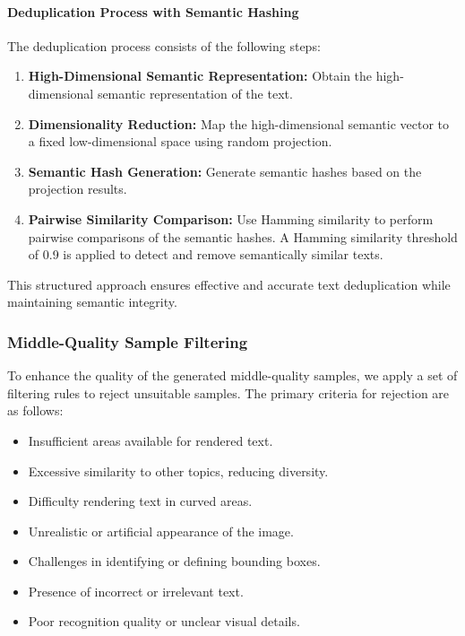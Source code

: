 \paragraph{Deduplication Process with Semantic Hashing}
The deduplication process consists of the following steps:
\begin{enumerate}
    \item \textbf{High-Dimensional Semantic Representation:} 
    Obtain the high-dimensional semantic representation of the text.

    \item \textbf{Dimensionality Reduction:}
    Map the high-dimensional semantic vector to a fixed low-dimensional space using random projection.

    \item \textbf{Semantic Hash Generation:}
    Generate semantic hashes based on the projection results.

    \item \textbf{Pairwise Similarity Comparison:}
    Use Hamming similarity to perform pairwise comparisons of the semantic hashes. A Hamming similarity threshold of 0.9 is applied to detect and remove semantically similar texts.

\end{enumerate}

This structured approach ensures effective and accurate text deduplication while maintaining semantic integrity.


\subsubsection{Middle-Quality Sample Filtering}

To enhance the quality of the generated middle-quality samples, we apply a set of filtering rules to reject unsuitable samples. The primary criteria for rejection are as follows:

\begin{itemize}
    \item Insufficient areas available for rendered text.
    \item Excessive similarity to other topics, reducing diversity.
    \item Difficulty rendering text in curved areas.
    \item Unrealistic or artificial appearance of the image.
    \item Challenges in identifying or defining bounding boxes.
    \item Presence of incorrect or irrelevant text.
    \item Poor recognition quality or unclear visual details.
\end{itemize}

